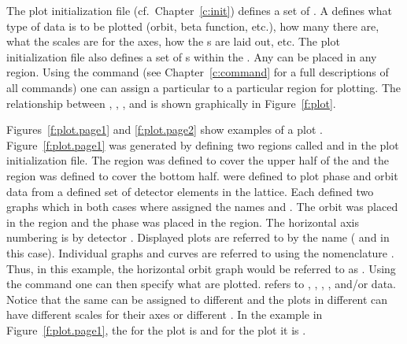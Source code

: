 The plot initialization file (cf.~Chapter~\ref{c:init}) defines a set
of . A  defines what type of data is
to be plotted (orbit, beta function, etc.), how many  there are,
what the scales are for the  axes, how the s are
laid out, etc.  The plot initialization file also defines a set of
s within the . Any  can be
placed in any region. Using the  command (see
Chapter~\ref{c:command} for a full descriptions of all commands) one
can assign a particular  to a particular region for
plotting.  The relationship between , ,
, and  is shown graphically in
Figure~\ref{f:plot}.

Figures~\ref{f:plot.page1} and \ref{f:plot.page2} show examples of a
plot . Figure~\ref{f:plot.page1} was generated by defining
two regions called  and  in the plot initialization
file. The  region was defined to cover the upper half of the
 and the  region was defined to cover the bottom
half.  were defined to plot phase and orbit data
from a defined set of detector elements in the lattice. Each
 defined two graphs which in both cases where
assigned the names  and . The orbit  was
placed in the  region and the phase  was
placed in the  region. The horizontal axis numbering is by
detector .  Displayed plots are referred to by the
 name ( and  in this case). Individual
graphs and curves are referred to using the nomenclature
. Thus, in this example, the horizontal orbit
graph would be referred to as .  Using the  command
one can then specify what  are plotted. 
refers to , , , , and/or
 data.  Notice that the same  can be
assigned to different  and the plots in different
 can have different scales for their axes or different
. In the example in Figure~\ref{f:plot.page1}, the
 for the  plot is  and for the
 plot it is .

